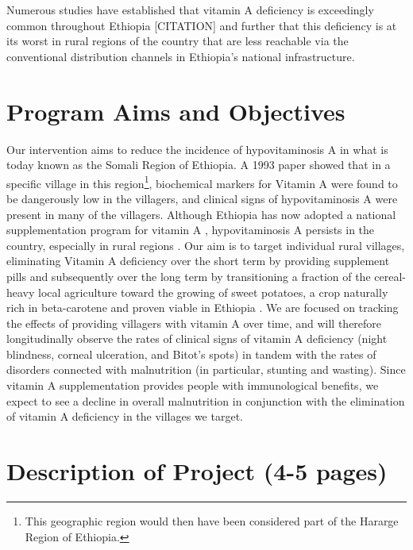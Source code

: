 \documentclass[12pt, letterpaper, draft]{article}
\begin{document}
Numerous studies have established that vitamin A deficiency is exceedingly common throughout Ethiopia [CITATION] and further that this deficiency is at its worst in rural regions of the country that are less reachable via the conventional distribution channels in Ethiopia's national infrastructure. 

\section{Program Aims and Objectives} %

Our intervention aims to reduce the incidence of hypovitaminosis A in what is today known as the Somali Region of Ethiopia. A 1993 paper \cite{wolde1993severe} showed that in a specific village in this region\footnote{This geographic region would then have been considered part of the Hararge Region of Ethiopia.}, biochemical markers for Vitamin A were found to be dangerously low in the villagers, and clinical signs of hypovitaminosis A were present in many of the villagers. Although Ethiopia has now adopted a national supplementation program for vitamin A \cite{semba2008coverage}, hypovitaminosis A persists in the country, especially in rural regions \cite{demissie2010magnitude}. Our aim is to target individual rural villages, eliminating Vitamin A deficiency over the short term by providing supplement pills and subsequently over the long term by transitioning a fraction of the cereal-heavy local agriculture toward the growing of sweet potatoes, a crop naturally rich in beta-carotene and proven viable in Ethiopia \cite{belehu2003agronomical}. We are focused on tracking the effects of providing villagers with vitamin A over time, and will therefore longitudinally observe the rates of clinical signs of vitamin A deficiency (night blindness, corneal ulceration, and Bitot's spots) in tandem with the rates of disorders connected with malnutrition (in particular, stunting and wasting). Since vitamin A supplementation provides people with immunological benefits, we expect to see a decline in overall malnutrition in conjunction with the elimination of vitamin A deficiency in the villages we target.



\section{Description of Project (4-5 pages)}
\end{document}
